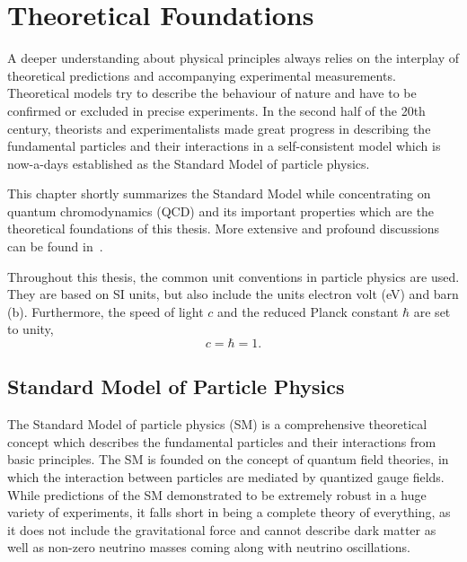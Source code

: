 
\chapter{Theoretical Foundations}
\label{sec:theoretical_foundations}

A deeper understanding about physical principles always relies on the interplay
of theoretical predictions and accompanying experimental measurements.
Theoretical models try to describe the behaviour of nature and have to be
confirmed or excluded in precise experiments. In the second half of the 20th
century, theorists and experimentalists made great progress in describing the
fundamental particles and their interactions in a self-consistent model which is
now-a-days established as the Standard Model of particle physics.

This chapter shortly summarizes the Standard Model while concentrating on
quantum chromodynamics (QCD) and its important properties which are the
theoretical foundations of this thesis. More extensive and profound
discussions can be found in~\cite{Peskin:1995ev,Agashe:2014kda,Ellis:1991qj,Buckley:2011ms}.

Throughout this thesis, the common unit conventions in particle physics are
used.  They are based on SI units, but also include the units electron volt
(\si{\electronvolt}) and barn (\si{\barn}). Furthermore, the speed of light $c$
and the reduced Planck constant $\hbar$ are set to unity,
%
\begin{equation*}
    c = \hbar = 1.
\end{equation*}

\section{Standard Model of Particle Physics}

The Standard Model of particle physics (SM) is a comprehensive theoretical
concept which describes the fundamental particles and their interactions from
basic principles. The SM is founded on the concept of quantum field theories, in
which the interaction between particles are mediated by quantized gauge fields.
While predictions of the SM demonstrated to be extremely robust in a huge variety
of experiments, it falls short in being a complete theory of everything, as it
does not include the gravitational force and cannot describe dark matter as well
as non-zero neutrino masses coming along with neutrino oscillations.

